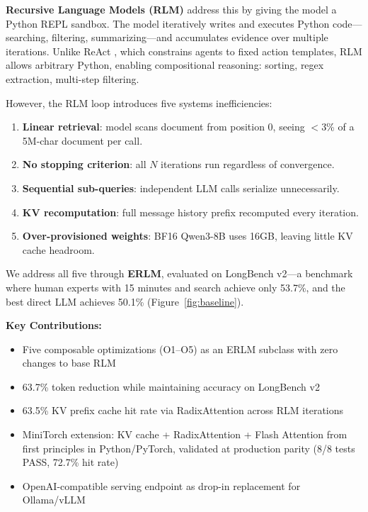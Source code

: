 \documentclass{article}
\begin{document}
\textbf{Recursive Language Models (RLM)} \citep{zhang2024rlm} address this by giving the model a Python REPL sandbox. The model iteratively writes and executes Python code---searching, filtering, summarizing---and accumulates evidence over multiple iterations. Unlike ReAct \citep{yao2022react}, which constrains agents to fixed action templates, RLM allows arbitrary Python, enabling compositional reasoning: sorting, regex extraction, multi-step filtering.

However, the RLM loop introduces five systems inefficiencies:
\begin{enumerate}[leftmargin=*, noitemsep]
    \item \textbf{Linear retrieval}: model scans document from position 0, seeing $<$3\% of a 5M-char document per call.
    \item \textbf{No stopping criterion}: all $N$ iterations run regardless of convergence.
    \item \textbf{Sequential sub-queries}: independent LLM calls serialize unnecessarily.
    \item \textbf{KV recomputation}: full message history prefix recomputed every iteration.
    \item \textbf{Over-provisioned weights}: BF16 Qwen3-8B uses 16GB, leaving little KV cache headroom.
\end{enumerate}

We address all five through \textbf{ERLM}, evaluated on LongBench v2---a benchmark where human experts with 15 minutes and search achieve only 53.7\%, and the best direct LLM achieves 50.1\% (Figure~\ref{fig:baseline}).

\textbf{Key Contributions:}
\begin{itemize}[leftmargin=*, noitemsep]
    \item Five composable optimizations (O1--O5) as an ERLM subclass with zero changes to base RLM
    \item 63.7\% token reduction while maintaining accuracy on LongBench v2
    \item 63.5\% KV prefix cache hit rate via RadixAttention across RLM iterations
    \item MiniTorch extension: KV cache + RadixAttention + Flash Attention from first principles in Python/PyTorch, validated at production parity (8/8 tests PASS, 72.7\% hit rate)
    \item OpenAI-compatible serving endpoint as drop-in replacement for Ollama/vLLM
\end{itemize}
\end{document}
